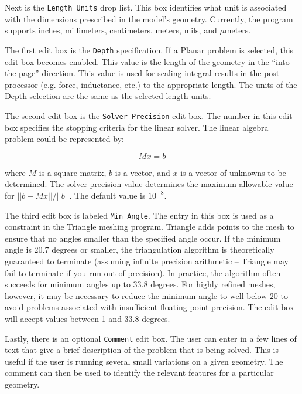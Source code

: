 \documentclass[12pt]{report}
\begin{document}
Next is the \texttt{Length Units} drop list. This box identifies
what unit is associated with the dimensions prescribed in the
model's geometry. Currently, the program supports inches,
millimeters, centimeters, meters, mils, and $\mu $meters.





The first edit box is the \texttt{Depth} specification. If a Planar
problem is selected, this edit box becomes enabled. This value is
the length of the geometry in the ``into the page'' direction. This
value is used for scaling integral results in the post processor
(e.g. force, inductance, etc.) to the appropriate length. The units
of the Depth selection are the same as the selected length units.

The second edit box is the \texttt{Solver Precision} edit box. The
number in this edit box specifies the stopping criteria for the
linear solver. The linear algebra problem could be represented by:

\begin{equation}
M x = b
\end{equation}

\noindent
where $M$ is a square matrix, $b$ is a vector, and $x$ is a vector of
unknowns to be determined. The solver precision value determines the maximum
allowable value for $\vert \vert b - Mx\vert \vert / \vert \vert b\vert
\vert $. The default value is $10^{ - 8}$.

The third edit box is labeled {\tt Min Angle}.  The entry in this box is used as a
constraint in the Triangle meshing program.  Triangle adds points to the mesh to
ensure that no angles smaller than the specified angle occur. If the minimum angle
is 20.7 degrees or smaller, the triangulation algorithm is theoretically guaranteed to
terminate (assuming infinite precision arithmetic -- Triangle may
fail to terminate if you run out of precision).  In practice, the
algorithm often succeeds for minimum angles up to 33.8 degrees.
For highly refined meshes, however, it may be necessary to reduce
the minimum angle to well below 20 to avoid problems associated
with insufficient floating-point precision.  The edit box will accept
values between 1 and 33.8 degrees.

Lastly, there is an optional \texttt{Comment} edit box. The user
can enter in a few lines of text that give a brief description of
the problem that is being solved. This is useful if the user is
running several small variations on a given geometry. The comment
can then be used to identify the relevant features for a particular
geometry.
\end{document}
